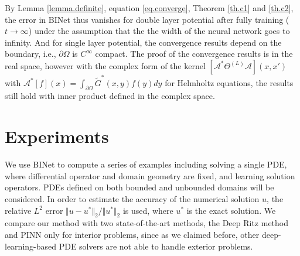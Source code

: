 \documentclass[hyperref]{article}
\numberwithin{equation}{section}
\theoremstyle{nonumberplain}
\begin{document}
	By Lemma \ref{lemma.definite}, equation \eqref{eq.converge}, Theorem \ref{th.c1} and \ref{th.c2}, the error in BINet thus vanishes for double layer potential after fully training ($t\to\infty$) under the assumption that the the width of the neural network goes to infinity. And for single layer potential, the convergence results depend on the boundary, i.e., $\partial\Omega$ is $C^\infty$ compact. The proof of the convergence results is in the real space, however with the complex form of the kernel $[\mathcal{A}^*\Theta^{(L)}\mathcal{A}](x,x')$ with $\mathcal{A}^*[f](x) = \int_{\partial\Omega}\tilde{G}^*(x,y)f(y)dy$ for Helmholtz equations, the results still hold with inner product defined in the complex space.
	
	
	
	
	
	
	
	
	
	
	
	
	
	
	
	
	
	
	
	
	\section{Experiments}
	\label{sec:num}
	
	We use BINet to compute a series of examples including solving a single PDE, where differential operator and domain geometry are fixed, and learning solution operators. PDEs defined on both bounded and unbounded domains will be considered. In order to estimate the accuracy of the numerical solution $u$, the relative $L^2$ error $\Vert u-u^{\ast}\Vert_2/\Vert u^{\ast}\Vert_2$ is used, where $u^{\ast}$ is the exact solution. We compare our method with two state-of-the-art methods, the Deep Ritz method and PINN only for interior problems, since as we claimed before, other deep-learning-based PDE solvers are not able to handle exterior problems.
	
	
\end{document}
